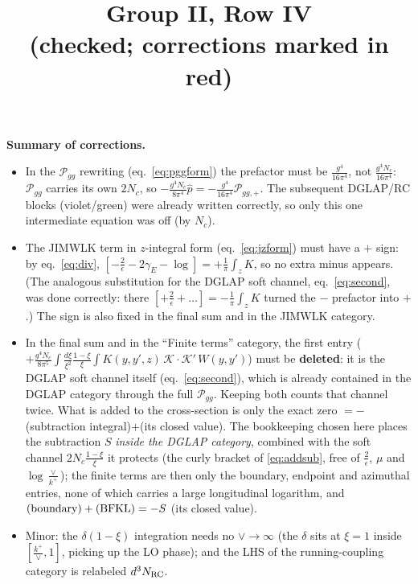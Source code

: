 \documentclass[9pt]{article}
\title{Group II, Row IV \\[2pt] {\normalsize (checked; corrections marked {\color{red}in red})}}
\author{}
\date{}
\numberwithin{equation}{section}
\begin{document}
\maketitle

{\color{red}\noindent\textbf{Summary of corrections.}
\begin{itemize}
\item[1.] In the $\mathcal P_{gg}$ rewriting (eq.~\eqref{eq:pggform}) the prefactor must be
$\frac{g^{4}}{16\pi^{4}}$, not $\frac{g^{4}N_{c}}{16\pi^{4}}$: $\mathcal P_{gg}$ carries its own
$2N_{c}$, so $-\frac{g^{4}N_{c}}{8\pi^{4}}\hat p=-\frac{g^{4}}{16\pi^{4}}\mathcal P_{gg,+}$. The
subsequent DGLAP/RC blocks (violet/green) were already written correctly, so only this one
intermediate equation was off (by $N_{c}$).
\item[2.] The JIMWLK term in $z$-integral form (eq.~\eqref{eq:jzform}) must have a $+$ sign:
by eq.~\eqref{eq:div}, $[-\frac{2}{\epsilon}-2\gamma_{E}-\log]=+\frac{1}{\pi}\int_{z}K$, so no
extra minus appears. (The analogous substitution for the DGLAP soft channel,
eq.~\eqref{eq:second}, was done correctly: there
$[+\frac{2}{\epsilon}+\dots]=-\frac{1}{\pi}\int_{z}K$ turned the $-$ prefactor into $+$.)
The sign is also fixed in the final sum and in the JIMWLK category.
\item[3.] In the final sum and in the ``Finite terms'' category, the first entry
($+\frac{g^{4}N_{c}}{8\pi^{5}}\int\frac{d\xi}{\xi^{2}}\frac{1-\xi}{\xi}\int K(y,y',z)\,
\mathcal K\!\cdot\!\mathcal K'\,W(y,y')$) must be \textbf{deleted}: it is the DGLAP soft channel
itself (eq.~\eqref{eq:second}), which is already contained in the DGLAP category through the
full $\mathcal P_{gg}$. Keeping both counts that channel twice. What is added to the
cross-section is only the exact zero $=-$(subtraction integral)$+$(its closed value). The
bookkeeping chosen here places the subtraction $S$ \emph{inside the DGLAP category}, combined
with the soft channel $2N_{c}\frac{1-\xi}{\xi}$ it protects (the curly bracket of
\eqref{eq:addsub}, free of $\frac{2}{\epsilon}$, $\mu$ and $\log\frac{\vee}{k^{+}}$); the
finite terms are then only the boundary, endpoint and azimuthal entries, none of which carries
a large longitudinal logarithm, and $({\rm boundary})+({\rm BFKL})=-S$ (its closed value).
\item[4.] Minor: the $\delta(1-\xi)$ integration needs no $\vee\to\infty$ (the $\delta$ sits at
$\xi=1$ inside $[\frac{k^{+}}{\vee},1]$, picking up the LO phase); and the LHS of the
running-coupling category is relabeled $d^{3}N_{\rm RC}$.
\end{itemize}}
\end{document}
